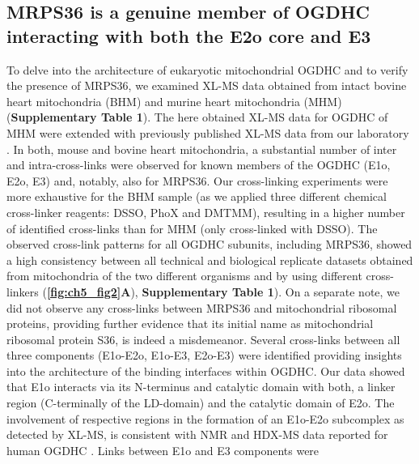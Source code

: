\subsection*{MRPS36 is a genuine member of OGDHC interacting with both the E2o core and E3}
To delve into the architecture of eukaryotic mitochondrial OGDHC and to verify the presence of MRPS36, we examined XL-MS data obtained from intact bovine heart mitochondria (BHM) \cite{Hevler_2021b} and murine heart mitochondria (MHM) (\textbf{Supplementary Table 1}). The here obtained XL-MS data for OGDHC of MHM were extended with previously published XL-MS data from our laboratory \cite{Liu_2018}. In both, mouse and bovine heart mitochondria, a substantial number of inter and intra-cross-links were observed for known members of the OGDHC (E1o, E2o, E3) and, notably, also for MRPS36. Our cross-linking experiments were more exhaustive for the BHM sample (as we applied three different chemical cross-linker reagents: DSSO, PhoX and DMTMM), resulting in a higher number of identified cross-links than for MHM (only cross-linked with DSSO). The observed cross-link patterns for all OGDHC subunits, including MRPS36, showed a high consistency between all technical and biological replicate datasets obtained from mitochondria of the two different organisms and by using different cross-linkers (\textbf{\autoref{fig:ch5_fig2}A}), \textbf{Supplementary Table 1}). On a separate note, we did not observe any cross-links between MRPS36 and mitochondrial ribosomal proteins, providing further evidence that its initial name as mitochondrial ribosomal protein S36, is indeed a misdemeanor. Several cross-links between all three components (E1o-E2o, E1o-E3, E2o-E3) were identified providing insights into the architecture of the binding interfaces within OGDHC. Our data showed that E1o interacts via its N-terminus and catalytic domain with both, a linker region (C-terminally of the LD-domain) and the catalytic domain of E2o. The involvement of respective regions in the formation of an E1o-E2o subcomplex as detected by XL-MS, is consistent with NMR and HDX-MS data reported for human OGDHC \cite{Zhou_2018}. Links between E1o and E3 components were

